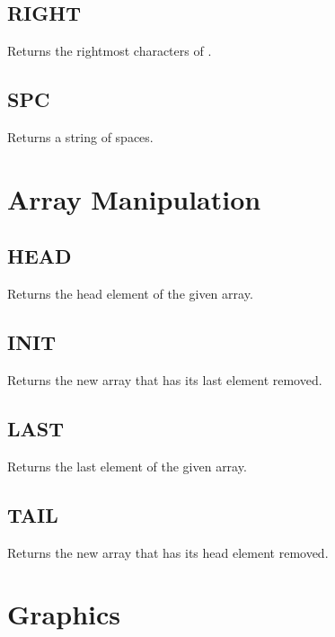     \subsection{RIGHT}
        \par
        Returns the rightmost  characters of .
    \subsection{SPC}
        \par
        Returns a string of  spaces.

\section{Array Manipulation}
        
    \subsection{HEAD}
        \par
        Returns the head element of the given array.
    \subsection{INIT}
        \par
        Returns the new array that has its last element removed.
    \subsection{LAST}
        \par
        Returns the last element of the given array.
    \subsection{TAIL}
        \par
        Returns the new array that has its head element removed.
        
\section{Graphics}

